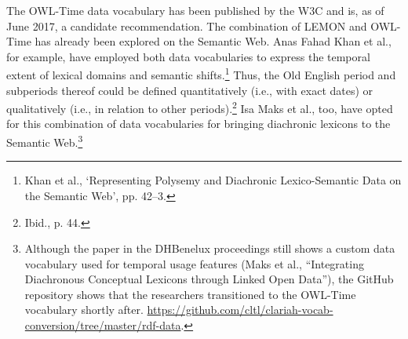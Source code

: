 The OWL-Time data vocabulary has been published by the W3C and is, as of June 2017, a candidate recommendation. The combination of LEMON and OWL-Time has already been explored on the Semantic Web. %
Anas Fahad Khan et al., for example, have employed both data vocabularies to express the temporal extent of lexical domains and semantic shifts.\footnote{Khan et al., `Representing Polysemy and Diachronic Lexico-Semantic Data on the Semantic Web', pp. 42–3.} %
Thus, the Old English period and subperiods thereof could be defined quantitatively (i.e., with exact dates) or qualitatively (i.e., in relation to other periods).\footnote{Ibid., p. 44.} Isa Maks et al., too, have opted for this combination of data vocabularies for bringing diachronic lexicons to the Semantic Web.\footnote{Although the paper in the DHBenelux proceedings still shows a custom data vocabulary used for temporal usage features (Maks et al., ``Integrating Diachronous Conceptual Lexicons through Linked Open Data''), the GitHub repository shows that the researchers transitioned to the OWL-Time vocabulary shortly after. \url{https://github.com/cltl/clariah-vocab-conversion/tree/master/rdf-data}.}

